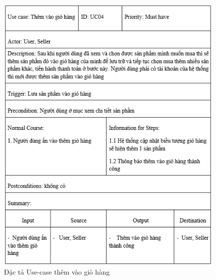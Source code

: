 \documentclass{article}
\begin{document}
{{{{	\begin{center}
		\begin{figure}[htp]
			\begin{center}
				\includegraphics[scale=.945]{anh13.png}
			\end{center}
			\caption{Đặc tả Use-case thêm vào giỏ hàng}
			

\end{figure}
\end{center}}}}}
\end{document}
